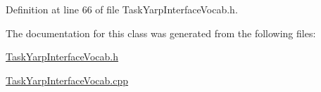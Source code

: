 Definition at line 66 of file Task\+Yarp\+Interface\+Vocab.\+h.



The documentation for this class was generated from the following files\+:\begin{DoxyCompactItemize}
\item 
\hyperlink{TaskYarpInterfaceVocab_8h}{Task\+Yarp\+Interface\+Vocab.\+h}\item 
\hyperlink{TaskYarpInterfaceVocab_8cpp}{Task\+Yarp\+Interface\+Vocab.\+cpp}\end{DoxyCompactItemize}
